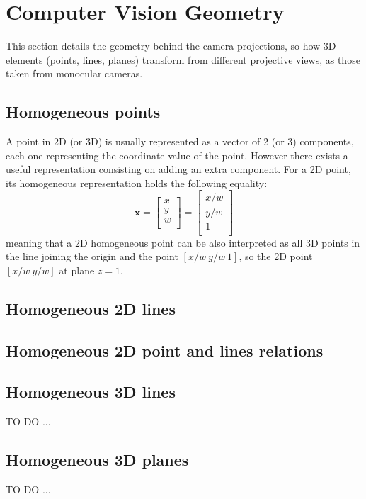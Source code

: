 \section{Computer Vision Geometry}
\label{sec:computer_vision_geometry}
This section details the geometry behind the camera projections, so how 3D elements (points, lines, planes) transform from different projective views, as those taken from monocular cameras.

\subsection{Homogeneous points}
A point in 2D (or 3D) is usually represented as a vector of 2 (or 3) components, each one representing the coordinate value of the point. However there exists a useful representation consisting on adding an extra component. For a 2D point, its homogeneous representation holds the following equality: 
\begin{equation}
 \mathbf{x} = 
 \left[
 \begin{array}{c}
  x\\
  y\\
  w\\
 \end{array}
\right] = 
\left[
 \begin{array}{c}
  x/w\\
  y/w\\
  1\\
 \end{array}
\right]
\end{equation}
meaning that a 2D homogeneous point can be also interpreted as all 3D points in the line joining the origin and the point $[x/w\ y/w\ 1]$, so the 2D point $[x/w\ y/w]$ at plane $z=1$. 

\subsection{Homogeneous 2D lines}

\subsection{Homogeneous 2D point and lines relations}

\subsection{Homogeneous 3D lines}
TO DO ...


\subsection{Homogeneous 3D planes}
TO DO ...



